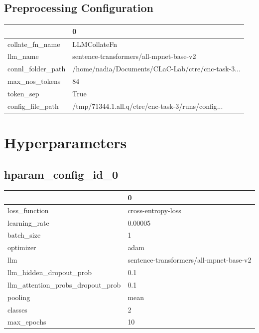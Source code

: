 \documentclass{article}
\begin{document}
\subsection{Preprocessing Configuration}
\begin{tabular}{ll}
\toprule
{} &                                                  0 \\
\midrule
collate\_fn\_name   &                                       LLMCollateFn \\
llm\_name          &            sentence-transformers/all-mpnet-base-v2 \\
connl\_folder\_path &  /home/nadia/Documents/CLaC-Lab/ctre/cnc-task-3... \\
max\_nos\_tokens    &                                                 84 \\
token\_sep         &                                               True \\
config\_file\_path  &  /tmp/71344.1.all.q/ctre/cnc-task-3/runs/config... \\
\bottomrule
\end{tabular}

\section{Hyperparameters}
\subsection{hparam\_config\_id\_0}
\begin{tabular}{ll}
\toprule
{} &                                        0 \\
\midrule
loss\_function                    &                       cross-entropy-loss \\
learning\_rate                    &                                  0.00005 \\
batch\_size                       &                                        1 \\
optimizer                        &                                     adam \\
llm                              &  sentence-transformers/all-mpnet-base-v2 \\
llm\_hidden\_dropout\_prob          &                                      0.1 \\
llm\_attention\_probs\_dropout\_prob &                                      0.1 \\
pooling                          &                                     mean \\
classes                          &                                        2 \\
max\_epochs                       &                                       10 \\
\bottomrule
\end{tabular}
\end{document}

